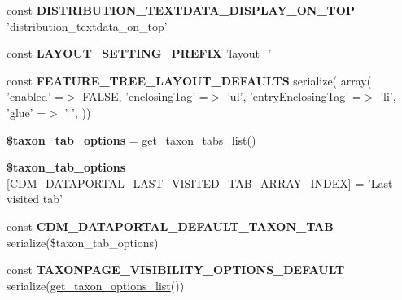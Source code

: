 \begin{DoxyCompactItemize}
\item 
\hypertarget{settings_8php_af7769a39f6537f9636aeffe531c90ce2}{const {\bfseries D\-I\-S\-T\-R\-I\-B\-U\-T\-I\-O\-N\-\_\-\-T\-E\-X\-T\-D\-A\-T\-A\-\_\-\-D\-I\-S\-P\-L\-A\-Y\-\_\-\-O\-N\-\_\-\-T\-O\-P} 'distribution\-\_\-textdata\-\_\-on\-\_\-top'}\label{settings_8php_af7769a39f6537f9636aeffe531c90ce2}

\item 
\hypertarget{settings_8php_a7eb7bec661d11400eadfc33b6beb0c4f}{const {\bfseries L\-A\-Y\-O\-U\-T\-\_\-\-S\-E\-T\-T\-I\-N\-G\-\_\-\-P\-R\-E\-F\-I\-X} 'layout\-\_\-'}\label{settings_8php_a7eb7bec661d11400eadfc33b6beb0c4f}

\item 
\hypertarget{settings_8php_aa32f7e54bebd2225f9c593856536c193}{const {\bfseries F\-E\-A\-T\-U\-R\-E\-\_\-\-T\-R\-E\-E\-\_\-\-L\-A\-Y\-O\-U\-T\-\_\-\-D\-E\-F\-A\-U\-L\-T\-S} serialize( array( 'enabled' =$>$ F\-A\-L\-S\-E, 'enclosing\-Tag' =$>$ 'ul', 'entry\-Enclosing\-Tag' =$>$ 'li', 'glue' =$>$ ' ', ))}\label{settings_8php_aa32f7e54bebd2225f9c593856536c193}

\item 
\hypertarget{settings_8php_a39ab68d75519e86e4e8ae05aab436d94}{{\bfseries \$taxon\-\_\-tab\-\_\-options} = \hyperlink{settings_8php_a8824b906ed3a77e5d4d5e43086a3b0f8}{get\-\_\-taxon\-\_\-tabs\-\_\-list}()}\label{settings_8php_a39ab68d75519e86e4e8ae05aab436d94}

\item 
\hypertarget{settings_8php_a2538d394cb3c485e0d2793d5dea6cf3a}{{\bfseries \$taxon\-\_\-tab\-\_\-options} \mbox{[}C\-D\-M\-\_\-\-D\-A\-T\-A\-P\-O\-R\-T\-A\-L\-\_\-\-L\-A\-S\-T\-\_\-\-V\-I\-S\-I\-T\-E\-D\-\_\-\-T\-A\-B\-\_\-\-A\-R\-R\-A\-Y\-\_\-\-I\-N\-D\-E\-X\mbox{]} = 'Last visited tab'}\label{settings_8php_a2538d394cb3c485e0d2793d5dea6cf3a}

\item 
\hypertarget{settings_8php_a181006915f45765ad4a94d64f1dd201e}{const {\bfseries C\-D\-M\-\_\-\-D\-A\-T\-A\-P\-O\-R\-T\-A\-L\-\_\-\-D\-E\-F\-A\-U\-L\-T\-\_\-\-T\-A\-X\-O\-N\-\_\-\-T\-A\-B} serialize(\$taxon\-\_\-tab\-\_\-options)}\label{settings_8php_a181006915f45765ad4a94d64f1dd201e}

\item 
\hypertarget{settings_8php_a3f5b2884fc2ffbd7bdac742cc8bdbfdf}{const {\bfseries T\-A\-X\-O\-N\-P\-A\-G\-E\-\_\-\-V\-I\-S\-I\-B\-I\-L\-I\-T\-Y\-\_\-\-O\-P\-T\-I\-O\-N\-S\-\_\-\-D\-E\-F\-A\-U\-L\-T} serialize(\hyperlink{settings_8php_a4d07113672784863c05b954f12ee136d}{get\-\_\-taxon\-\_\-options\-\_\-list}())}\label{settings_8php_a3f5b2884fc2ffbd7bdac742cc8bdbfdf}


\end{DoxyCompactItemize}

